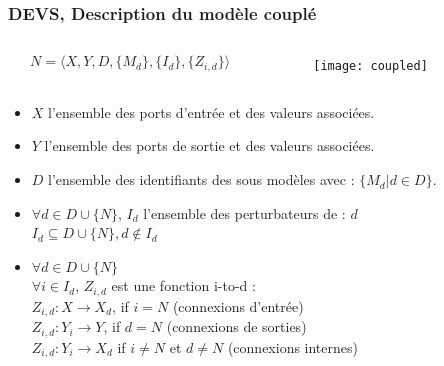 \documentclass[xetex, compress, table, svgnames]{beamer}
\begin{document}
\begin{frame}
  \frametitle{DEVS, Description du modèle couplé}
  \begin{exampleblock}{}
    \begin{columns}
      \begin{column}[c]{.45\textwidth}
        \begin{equation*}
          N = \langle X, Y, D, \{M_d\}, \{I_d\}, \{Z_{i,d}\} \rangle
        \end{equation*}
      \end{column}
      \begin{column}{.45\textwidth}
        \begin{figure}[h]
          \begin{center}
            \texttt{[image: coupled]}
          \end{center}
        \end{figure}
      \end{column}
    \end{columns}
  \end{exampleblock}
  \begin{exampleblock}{}
    \begin{itemize}[<+->]
    \item $X$ l'ensemble des \alert{ports d'entrée} et des valeurs
      associées.
    \item $Y$ l'ensemble des \alert{ports de sortie} et des valeurs
      associées.
    \item $D$ l'ensemble des \alert{identifiants des sous modèles}
      avec : $\{ M_d | d \in D \}$.
    \item $\forall d \in D \cup \{N\}$, $I_d$ l'ensemble des perturbateurs de : $d$\\$I_d \subseteq D \cup \{N\},d \notin I_d$
    \item $\forall d \in D \cup \{N\}$\\
      $\forall i \in I_d$, $Z_{i,d}$ est une fonction i-to-d :\\
      \hspace{1cm}$Z_{i,d}:X \rightarrow X_d$, if $i = N$ (connexions d'entrée)\\
      \hspace{1cm}$Z_{i,d}:Y_i \rightarrow Y$, if $d = N$ (connexions de sorties)\\
      \hspace{1cm}$Z_{i,d}:Y_i \rightarrow X_d$ if $i \neq N$ et $d
      \neq N$ (connexions internes)
    \end{itemize}
  \end{exampleblock}
\end{frame}
\end{document}
